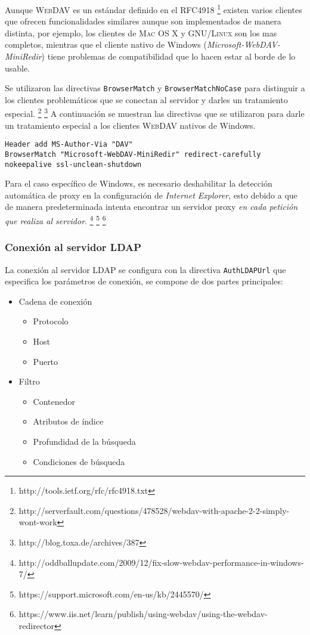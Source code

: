 Aunque \textsc{WebDAV} es un est\'{a}ndar definido en el RFC4918 \footnote{http://tools.ietf.org/rfc/rfc4918.txt} existen varios clientes que ofrecen funcionalidades similares aunque son implementados de manera distinta, por ejemplo, los clientes de \textsc{Mac OS X} y \textsc{GNU/Linux} son los mas completos, mientras que el cliente nativo de Windows (\textit{Microsoft-WebDAV-MiniRedir}) tiene problemas de compatibilidad que lo hacen estar al borde de lo usable.

Se utilizaron las directivas \texttt{BrowserMatch} y \texttt{BrowserMatchNoCase} para distinguir a los clientes problem\'{a}ticos que se conectan al servidor y darles un tratamiento especial. \footnote{http://serverfault.com/questions/478528/webdav-with-apache-2-2-simply-wont-work} \footnote{http://blog.toxa.de/archives/387} A continuaci\'{o}n se muestran las directivas que se utilizaron para darle un tratamiento especial a los clientes \textsc{WebDAV} nativos de Windows.

{
\scriptsize
\linespread{1}
\begin{verbatim}
Header add MS-Author-Via "DAV" 
BrowserMatch "Microsoft-WebDAV-MiniRedir" redirect-carefully nokeepalive ssl-unclean-shutdown 
\end{verbatim}
}

Para el caso espec\'{i}fico de Windows, es necesario deshabilitar la detecci\'{o}n autom\'{a}tica de proxy en la configuraci\'{o}n de \textit{Internet Explorer}, esto debido a que de manera predeterminada intenta encontrar un servidor proxy \textit{en cada petici\'{o}n que realiza al servidor}.
\footnote{http://oddballupdate.com/2009/12/fix-slow-webdav-performance-in-windows-7/}
\footnote{https://support.microsoft.com/en-us/kb/2445570/}
\footnote{https://www.iis.net/learn/publish/using-webdav/using-the-webdav-redirector}

        \subsubsection {Conexi\'{o}n al servidor \textsc{LDAP}}

La conexi\'{o}n al servidor LDAP se configura con la directiva \texttt{AuthLDAPUrl} que especifica los par\'{a}metros de conexi\'{o}n, se compone de dos partes principales:

\begin{itemize}
  \item Cadena de conexi\'{o}n
  \begin{itemize}
    \item Protocolo
    \item Host
    \item Puerto
  \end{itemize}
  \item Filtro
  \begin{itemize}
    \item Contenedor
    \item Atributos de \'{i}ndice
    \item Profundidad de la b\'{u}squeda
    \item Condiciones de b\'{u}squeda
  \end{itemize}
\end{itemize}

